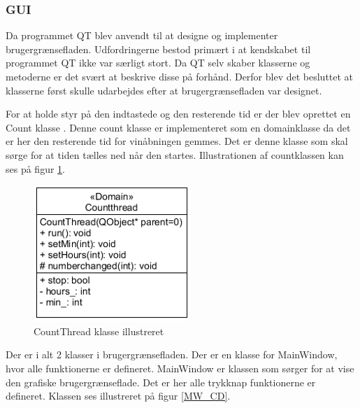 \subsubsection{GUI}

Da programmet QT blev anvendt til at designe og implementer brugergrænsefladen. Udfordringerne bestod primært i at kendskabet til programmet QT ikke var særligt stort. Da QT selv skaber klasserne og metoderne er det svært at beskrive disse på forhånd. Derfor blev det besluttet at klasserne først skulle udarbejdes efter at brugergrænsefladen var designet. 

For at holde styr på den indtastede og den resterende tid er der blev oprettet en Count klasse . Denne count klasse er implementeret som en domainklasse da det er her den resterende tid for vinåbningen gemmes. Det er denne klasse som skal sørge for at tiden tælles ned når den startes. Illustrationen af countklassen kan ses på figur \ref{CT_CD}.

\begin{figure}[H]
	\centerline{\includegraphics[scale=1]{tex/Design/GUI/Fotos/CountThread}}
	\caption{CountThread klasse illustreret}
	\label{CT_CD}
\end{figure}

Der er i alt 2 klasser i brugergrænsefladen. Der er en klasse for MainWindow, hvor alle funktionerne er defineret. MainWindow er klassen som sørger for at vise den grafiske brugergrænseflade. Det er her alle trykknap funktionerne er defineret. Klassen ses illustreret på figur \ref{MW_CD}. 

